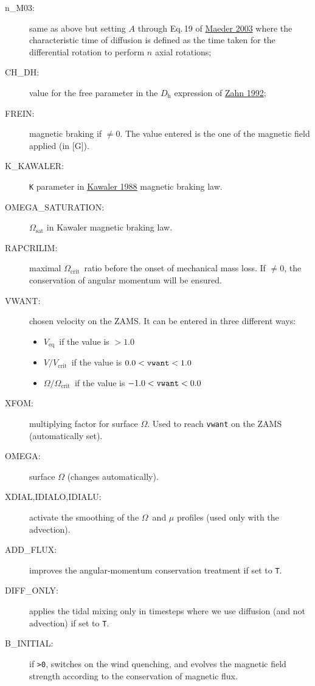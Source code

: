\documentclass[11pt]{article}
\def\om{\ensuremath{\Omega}}
\def\omcrit{\ensuremath{\om_\text{crit}}}
\def\veq{\ensuremath{V_\text{eq}}}
\def\vcrit{\ensuremath{V_\text{crit}}}
\def\rapv{\ensuremath{V/\vcrit}}
\def\omcrit{\ensuremath{\om_\text{crit}}}
\def\rapom{\ensuremath{\om/\omcrit}}
\def\ddh{\ensuremath{D_\text{h}}}
\begin{document}
\begin{description}
\begin{description}
      \item[n\_M03:] same as above but setting $A$ through Eq.\,19 of \href{https://ui.adsabs.harvard.edu/abs/2003A&A...399..263M}{Maeder 2003} where the characteristic time of diffusion is defined as the time taken for the differential rotation to perform $n$ axial rotations;
      \item[CH\_DH:] value for the free parameter in the {\ddh} expression of \href{https://ui.adsabs.harvard.edu/abs/1992A&A...265..115Z}{Zahn 1992};
      \item[FREIN:] magnetic braking if $\ne 0$. The value entered is the one of the magnetic field applied (in [G]).
      \item[K\_KAWALER:] \texttt{K} parameter in \href{https://ui.adsabs.harvard.edu/abs/1988ApJ...333..236K}{Kawaler 1988} magnetic braking law.
      \item[OMEGA\_SATURATION:] $\Omega_\text{sat}$ in Kawaler magnetic braking law.
      \item[RAPCRILIM:] maximal \omcrit\ ratio before the onset of mechanical mass loss. If $\ne 0$, the conservation of angular momentum will be ensured.
      \item[VWANT:] chosen velocity on the ZAMS. It can be entered in three different ways:
        \begin{itemize}
          \item \veq\ if the value is $> 1.0$
          \item \rapv\ if the value is $0.0 < \text{\tt vwant} < 1.0$
          \item \rapom\ if the value is $-1.0 <  \text{\tt vwant} < 0.0$
        \end{itemize}
      \item[XFOM:] multiplying factor for surface $\Omega$. Used to reach \texttt{vwant} on the ZAMS (automatically set).
      \item[OMEGA:] surface $\Omega$ (changes automatically).
      \item[XDIAL,IDIALO,IDIALU:] activate the smoothing of the \om\ and $\mu$ profiles (used only with the advection).
      \item[ADD\_FLUX:] improves the angular-momentum conservation treatment if set to \texttt{T}.
      \item[DIFF\_ONLY:] applies the tidal mixing only in timesteps where we use diffusion (and not advection) if set to \texttt{T}.
      \item[B\_INITIAL:] if \texttt{>0}, switches on the wind quenching, and evolves the magnetic field strength according to the conservation of magnetic flux.

\end{description}
\end{description}
\end{document}
